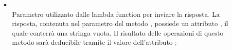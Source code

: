 \begin{itemize}
\begin{itemize}
\begin{itemize}
Tali dati sono:
\begin{lstlisting}[language=json,firstnumber=1]
{
    "msg":"NotificationMessage",
    "send\_to":"String"
}
\end{lstlisting}
Dove  è un oggetto di tipo , mentre  è una stringa contenente il mittente del messaggio;
			\item {} \\
			Parametro utilizzato dalle lambda function per inviare la risposta. La risposta, contenuta nel  parametro del metodo , possiede un attributo , il quale conterrà una stringa vuota. Il risultato delle operazioni di questo metodo sarà deducibile tramite il valore dell'attributo ;
		\end{itemize}
	\end{itemize}
\end{itemize}
\FloatBarrier

